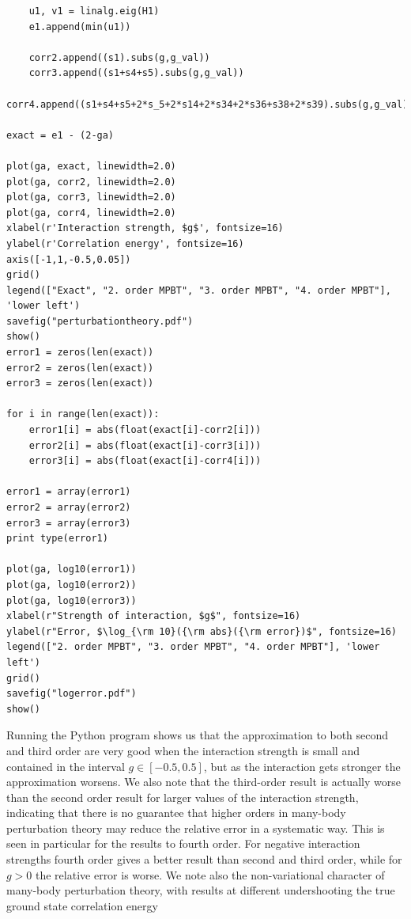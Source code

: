 \begin{prob}
\begin{lstlisting}
	u1, v1 = linalg.eig(H1)
	e1.append(min(u1))

	corr2.append((s1).subs(g,g_val))
	corr3.append((s1+s4+s5).subs(g,g_val))
	corr4.append((s1+s4+s5+2*s_5+2*s14+2*s34+2*s36+s38+2*s39).subs(g,g_val))

exact = e1 - (2-ga)

plot(ga, exact, linewidth=2.0)
plot(ga, corr2, linewidth=2.0)
plot(ga, corr3, linewidth=2.0)
plot(ga, corr4, linewidth=2.0)
xlabel(r'Interaction strength, $g$', fontsize=16)
ylabel(r'Correlation energy', fontsize=16)
axis([-1,1,-0.5,0.05])
grid()
legend(["Exact", "2. order MPBT", "3. order MPBT", "4. order MPBT"], 'lower left')
savefig("perturbationtheory.pdf")
show()
error1 = zeros(len(exact))
error2 = zeros(len(exact))
error3 = zeros(len(exact))

for i in range(len(exact)):
	error1[i] = abs(float(exact[i]-corr2[i]))
	error2[i] = abs(float(exact[i]-corr3[i]))
	error3[i] = abs(float(exact[i]-corr4[i]))

error1 = array(error1)
error2 = array(error2)
error3 = array(error3)
print type(error1)

plot(ga, log10(error1))
plot(ga, log10(error2))
plot(ga, log10(error3))
xlabel(r"Strength of interaction, $g$", fontsize=16)
ylabel(r"Error, $\log_{\rm 10}({\rm abs}({\rm error})$", fontsize=16)
legend(["2. order MPBT", "3. order MPBT", "4. order MPBT"], 'lower left')
grid()
savefig("logerror.pdf")
show()
\end{lstlisting}

Running the Python program shows us that
the approximation to both second and third order are very
good when the interaction strength is small and contained in the interval
$g\in[-0.5,0.5]$, but as the
interaction gets stronger the approximation worsens. We also
note that the third-order result is actually worse than the second order result
for larger values of the interaction strength, indicating that there is no guarantee that higher orders
in many-body perturbation theory may reduce the relative error in a systematic way.
This is seen in particular for the results to fourth order. For negative interaction strengths
fourth order gives a better result than second and third order, while for $g>0$ the relative error is
worse.
We note also the non-variational character of many-body perturbation theory, with results at different undershooting the true ground state correlation energy

\end{prob}


